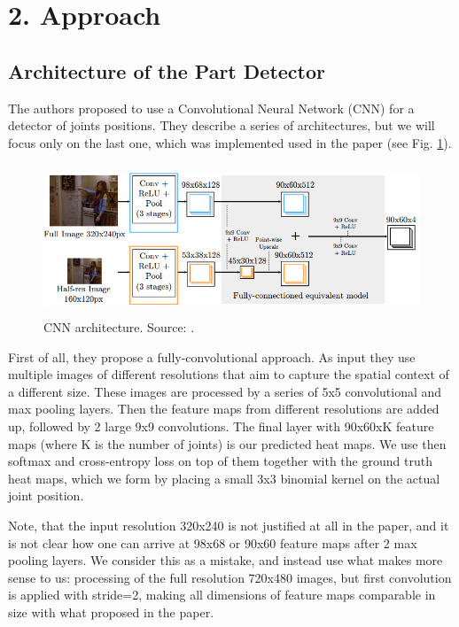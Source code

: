 \documentclass[a4paper,10pt]{article}
\begin{document}
\section{2. Approach}
	\subsection{Architecture of the Part Detector}
	The authors proposed to use a Convolutional Neural Network (CNN) for a detector of joints positions. They describe a series of architectures, but we will focus only on the last one, which was implemented used in the paper (see Fig. \ref{cnn_architecture}).
	\begin{figure}[H]
 		\includegraphics[height=4.5cm]{img/cnn_architecture.png}
		\caption{CNN architecture. Source: \cite{cnn_pgm_for_hpe}.}
		\label{cnn_architecture}
	\end{figure}
	First of all, they propose a fully-convolutional approach. As input they use multiple images of different resolutions that aim to capture the spatial context of a different size. These images are processed by a series of 5x5 convolutional and max pooling layers. Then the feature maps from different resolutions are added up, followed by 2 large 9x9 convolutions. The final layer with 90x60xK feature maps (where K is the number of joints) is our predicted heat maps. We use then softmax and cross-entropy loss on top of them together with the ground truth heat maps, which we form by placing a small 3x3 binomial kernel on the actual joint position. 
	
	Note, that the input resolution 320x240 is not justified at all in the paper, and it is not clear how one can arrive at 98x68 or 90x60 feature maps after 2 max pooling layers. We consider this as a mistake, and instead use what makes more sense to us: processing of the full resolution 720x480 images, but first convolution is applied with stride=2, making all dimensions of feature maps comparable in size with what proposed in the paper.
	
\end{document}
